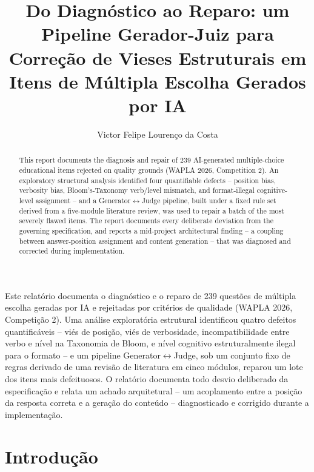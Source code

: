 \documentclass[12pt]{article}
\title{Do Diagnóstico ao Reparo: um Pipeline Gerador-Juiz para
  Correção de Vieses Estruturais em Itens de Múltipla Escolha
  Gerados por IA}
\author{Victor Felipe Lourenço da Costa\inst{1}}
\begin{document}
\maketitle

\begin{abstract}
  This report documents the diagnosis and repair of 239 AI-generated
  multiple-choice educational items rejected on quality grounds (WAPLA 2026,
  Competition 2). An exploratory structural analysis identified four
  quantifiable defects -- position bias, verbosity bias, Bloom's-Taxonomy
  verb/level mismatch, and format-illegal cognitive-level assignment -- and a
  Generator$\leftrightarrow$Judge pipeline, built under a fixed rule set
  derived from a five-module literature review, was used to repair a batch of
  the most severely flawed items. The report documents every deliberate
  deviation from the governing specification, and reports a mid-project
  architectural finding -- a coupling between answer-position assignment and
  content generation -- that was diagnosed and corrected during
  implementation.
\end{abstract}

\begin{resumo}
  Este relatório documenta o diagnóstico e o reparo de 239 questões de
  múltipla escolha geradas por IA e rejeitadas por critérios de qualidade
  (WAPLA 2026, Competição 2). Uma análise exploratória estrutural identificou
  quatro defeitos quantificáveis -- viés de posição, viés de verbosidade,
  incompatibilidade entre verbo e nível na Taxonomia de Bloom, e nível
  cognitivo estruturalmente ilegal para o formato -- e um pipeline
  Generator$\leftrightarrow$Judge, sob um conjunto fixo de regras derivado de
  uma revisão de literatura em cinco módulos, reparou um lote dos itens mais
  defeituosos. O relatório documenta todo desvio deliberado da especificação
  e relata um achado arquitetural -- um acoplamento entre a posição da
  resposta correta e a geração do conteúdo -- diagnosticado e corrigido
  durante a implementação.
\end{resumo}

\section{Introdução}
\label{sec:introducao}
\end{document}
